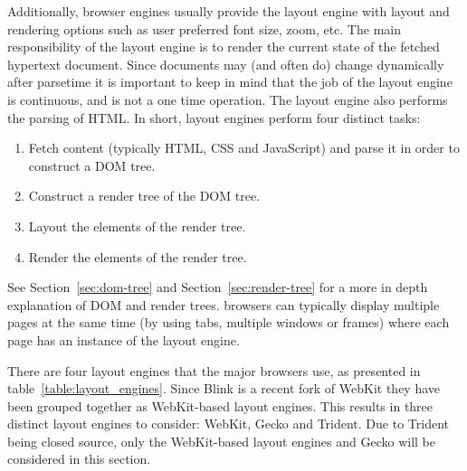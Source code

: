 \documentclass[a4paper,11pt]{kth-mag}
\begin{document}
        Additionally, browser engines usually provide the layout engine with layout and rendering options such as user preferred font size, zoom, etc.
        The main responsibility of the \gls{layout engine} is to render the current state of the fetched \gls{hypertext} \gls{document}.
        Since \glspl{document} may (and often do) change dynamically after parsetime it is important to keep in mind that the job of the \gls{layout engine} is continuous, and is not a one time operation.
        The \gls{layout engine} also performs the parsing of \gls{HTML}.
        In short, \glspl{layout engine} perform four distinct tasks:
        \begin{enumerate}
          \item Fetch content (typically \gls{HTML}, \gls{CSS} and \gls{JavaScript}) and parse it in order to construct a \gls{DOM} tree. 
          \item Construct a \gls{render tree} of the \gls{DOM} tree.
          \item Layout the \glspl{element} of the \gls{render tree}.
          \item Render the \glspl{element} of the \gls{render tree}.
        \end{enumerate}
        See Section~\ref{sec:dom-tree} and Section~\ref{sec:render-tree} for a more in depth explanation of \gls{DOM} and \glspl{render tree}.
        \Glspl{browser} can typically display multiple pages at the same time (by using tabs, multiple windows or frames) where each page has an instance of the \gls{layout engine}.

        There are four \glspl{layout engine} that the major \glspl{browser} use, as presented in table~\ref{table:layout_engines}.
        Since Blink is a recent \gls{fork} of \gls{WebKit} they have been grouped together as \gls{WebKit}-based \glspl{layout engine}.
        This results in three distinct \glspl{layout engine} to consider: \gls{WebKit}, Gecko and Trident.
        Due to Trident being closed source, only the \gls{WebKit}-based \glspl{layout engine} and Gecko will be considered in this section.
\end{document}
